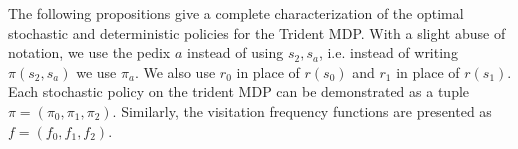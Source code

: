 The following propositions give a complete characterization of the optimal stochastic and deterministic policies for the Trident MDP. With a slight abuse of notation, we use the pedix $a$ instead of using $s_2,s_a$, i.e. instead of writing $\pi(s_2, s_a)$ we use $\pi_a$. 
We also use $r_{0}$ in place of $r(s_0)$ and $r_{1}$ in place of $r(s_1)$. Each stochastic policy on the trident MDP can be demonstrated as a tuple $\pi = (\pi_0, \pi_1, \pi_2)$. %
Similarly, the visitation frequency functions are presented as $f = (f_0, f_1, f_2)$.

